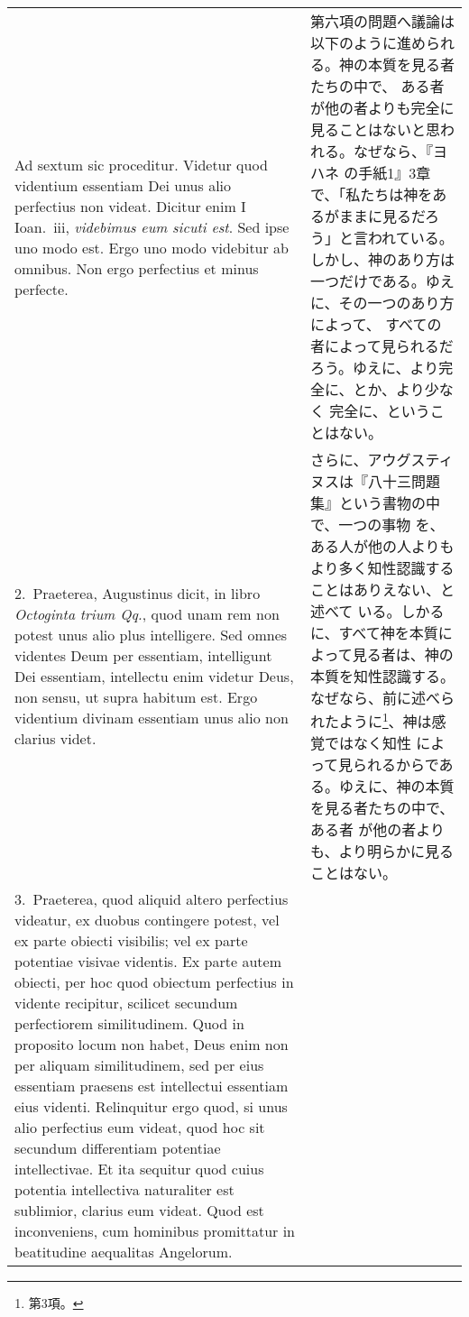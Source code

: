 \documentclass[10pt]{jsarticle} %
\begin{document}
\begin{longtable}{p{21em}p{21em}}
{\sc Ad sextum sic proceditur}. Videtur quod videntium essentiam Dei
unus alio perfectius non videat. Dicitur enim I Ioan.\ {\sc iii}, {\it
videbimus eum sicuti est}. Sed ipse uno modo est. Ergo uno modo
videbitur ab omnibus. Non ergo perfectius et minus perfecte.

&

第六項の問題へ議論は以下のように進められる。神の本質を見る者たちの中で、
ある者が他の者よりも完全に見ることはないと思われる。なぜなら、『ヨハネ
の手紙1』3章で、「私たちは神をあるがままに見るだろう」と言われている。
しかし、神のあり方は一つだけである。ゆえに、その一つのあり方によって、
すべての者によって見られるだろう。ゆえに、より完全に、とか、より少なく
完全に、ということはない。

\\


2.~{\sc Praeterea}, Augustinus dicit, in libro {\it Octoginta trium
Qq.}, quod unam rem non potest unus alio plus intelligere. Sed omnes
videntes Deum per essentiam, intelligunt Dei essentiam, intellectu
enim videtur Deus, non sensu, ut supra habitum est. Ergo videntium
divinam essentiam unus alio non clarius videt.

&

さらに、アウグスティヌスは『八十三問題集』という書物の中で、一つの事物
を、ある人が他の人よりもより多く知性認識することはありえない、と述べて
いる。しかるに、すべて神を本質によって見る者は、神の本質を知性認識する。
なぜなら、前に述べられたように\footnote{第3項。}、神は感覚ではなく知性
によって見られるからである。ゆえに、神の本質を見る者たちの中で、ある者
が他の者よりも、より明らかに見ることはない。


\\


3.~{\sc Praeterea}, quod aliquid altero perfectius videatur, ex duobus
contingere potest, vel ex parte obiecti visibilis; vel ex parte
potentiae visivae videntis. Ex parte autem obiecti, per hoc quod
obiectum perfectius in vidente recipitur, scilicet secundum
perfectiorem similitudinem. Quod in proposito locum non habet, Deus
enim non per aliquam similitudinem, sed per eius essentiam praesens
est intellectui essentiam eius videnti. Relinquitur ergo quod, si unus
alio perfectius eum videat, quod hoc sit secundum differentiam
potentiae intellectivae. Et ita sequitur quod cuius potentia
intellectiva naturaliter est sublimior, clarius eum videat. Quod est
inconveniens, cum hominibus promittatur in beatitudine aequalitas
Angelorum.


\end{longtable}
\end{document}

